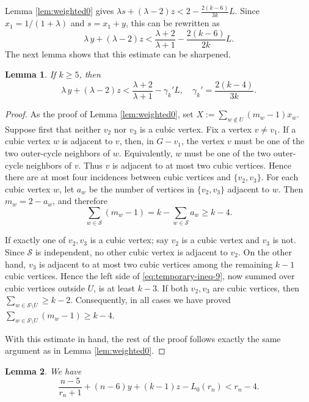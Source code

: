 \documentclass[11pt]{article}
\theoremstyle{plain}
\newtheorem{lemma}{Lemma}[section]
\theoremstyle{definition}
\numberwithin{equation}{section}
\begin{document}
Lemma \ref{lem:weighted0} gives 
$\lambda s + (\lambda - 2) z < 2 - \frac{2(k - 6)}{3k} L$. Since $x_1 = 1/(1+\lambda)$ 
and $s = x_1 + y$, this can be rewritten as 
\[
\lambda\, y + (\lambda - 2) z < \frac{\lambda + 2}{\lambda + 1} - \frac{2(k-6)}{2k} L.
\]
The next lemma shows that this estimate can be sharpened.

\begin{lemma}\label{lem:weighted1}
If $k\geq 5$, then
\[
\lambda\, y + (\lambda - 2)z
< \frac{\lambda + 2}{\lambda + 1} - \gamma_k' L, \quad
\gamma_k' = \frac{2(k-4)}{3k}.
\]
\end{lemma}

\begin{proof}
As the proof of Lemma \ref{lem:weighted0}, set $X := \sum_{w\notin U} (m_w - 1) x_w$.
Suppose first that neither $v_2$ nor $v_3$ is a cubic vertex. Fix a vertex $v\neq v_1$. 
If a cubic vertex $w$ is adjacent to $v$, then, in $G-v_1$, the vertex $v$ must be one 
of the two outer-cycle neighbors of $w$. Equivalently, $w$ must be one of the two outer-cycle 
neighbors of $v$. Thus $v$ is adjacent to at most two cubic vertices. Hence there are at most
four incidences between cubic vertices and $\{v_2,v_3\}$. 
For each cubic vertex $w$, let $a_w$ be the number of vertices in $\{v_2,v_3\}$ adjacent to $w$. Then
$m_w = 2 - a_w$, and therefore
\begin{equation}\label{eq:temporary-ineq-9}
\sum_{w\in\mathcal{S}} (m_w - 1)
= k - \sum_{w\in\mathcal{S}} a_w\geq k-4.
\end{equation}

If exactly one of $v_2,v_3$ is a cubic vertex; say $v_2$ is a cubic vertex and $v_3$ is not. 
Since $\mathcal{S}$ is independent, no other cubic vertex is adjacent to $v_2$. On the other hand, 
$v_3$ is adjacent to at most two cubic vertices among the remaining $k-1$ cubic vertices. 
Hence the left side of \eqref{eq:temporary-ineq-9}, now summed over cubic vertices
outside $U$, is at least $k-3$. If both $v_2,v_3$ are cubic vertices, then 
$\sum_{w\in\mathcal{S}\setminus U} \geq k-2$. Consequently, in all cases we have proved 
$\sum_{w\in\mathcal{S}\setminus U} (m_w - 1)\geq k - 4$.

With this estimate in hand, the rest of the proof follows exactly the
same argument as in Lemma \ref{lem:weighted0}.
\end{proof}

\begin{lemma}\label{lem:normalized-second}
We have
\begin{equation}\label{eq:second-univer}
\frac{n-5}{r_n+1} + (n-6)y + (k-1)z - L_0(r_n) < r_n - 4.
\end{equation}
\end{lemma}
\end{document}
